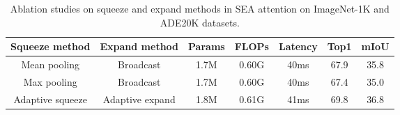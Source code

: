 \begin{table*}[htb]
  \centering


      \begin{tabular}{c c  | c c c c c}
        \hline

        \hline

        \hline
        Squeeze method  & Expand method   & {Params}     & {FLOPs}    & {Latency}     & {Top1}     &  {mIoU} \\
        \hline

        \hline
        \hline
        Mean pooling & Broadcast  & 1.7M     & 0.60G    & 40ms    & 67.9  & 35.8   \\
        Max pooling & Broadcast  & 1.7M     & 0.60G     & 40ms    & 67.4   & 35.0   \\
        Adaptive squeeze & Adaptive expand & 1.8M     & 0.61G     & 41ms    & 69.8   & 36.8   \\
        \hline

        \hline

        \hline
    \end{tabular}
    \caption{Ablation studies on squeeze and expand methods in SEA attention on ImageNet-1K and ADE20K datasets.}
    \label{ablate_adasqueeze}
\end{table*}